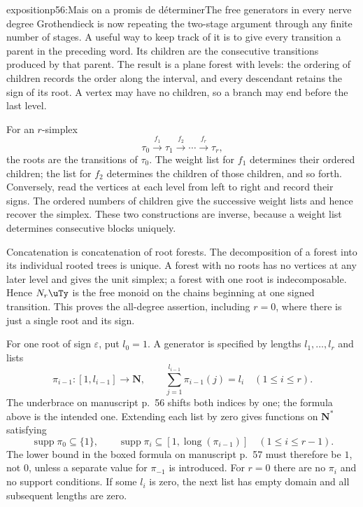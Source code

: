 \begin{dcomment}{exposition}{p56:Mais on a promis de déterminer}{The free generators in every nerve degree}
Grothendieck is now repeating the two-stage argument through any finite number of stages. A useful way to keep track of it is to give every transition a parent in the preceding word. Its children are the consecutive transitions produced by that parent. The result is a plane forest with levels: the ordering of children records the order along the interval, and every descendant retains the sign of its root. A vertex may have no children, so a branch may end before the last level.

For an $r$-simplex
\[
 \tau_0\xrightarrow{f_1}\tau_1\xrightarrow{f_2}\cdots
 \xrightarrow{f_r}\tau_r,
\]
the roots are the transitions of $\tau_0$. The weight list for $f_1$ determines their ordered children; the list for $f_2$ determines the children of those children, and so forth. Conversely, read the vertices at each level from left to right and record their signs. The ordered numbers of children give the successive weight lists and hence recover the simplex. These two constructions are inverse, because a weight list determines consecutive blocks uniquely.

Concatenation is concatenation of root forests. The decomposition of a forest into its individual rooted trees is unique. A forest with no roots has no vertices at any later level and gives the unit simplex; a forest with one root is indecomposable. Hence $N_r\uTy$ is the free monoid on the chains beginning at one signed transition. This proves the all-degree assertion, including $r=0$, where there is just a single root and its sign.

For one root of sign $\varepsilon$, put $l_0=1$. A generator is specified by lengths $l_1,\ldots,l_r$ and lists
\[
 \pi_{i-1}:[1,l_{i-1}]\longrightarrow\mathbf N,
 \qquad
 \sum_{j=1}^{l_{i-1}}\pi_{i-1}(j)=l_i
 \quad(1\leq i\leq r).
\]
The underbrace on manuscript p.~56 shifts both indices by one; the formula above is the intended one. Extending each list by zero gives functions on $\mathbf N^*$ satisfying
\[
 \operatorname{supp}\pi_0\subseteq\{1\},\qquad
 \operatorname{supp}\pi_i\subseteq
 [1,\operatorname{long}(\pi_{i-1})]
 \quad(1\leq i\leq r-1).
\]
The lower bound in the boxed formula on manuscript p.~57 must therefore be $1$, not $0$, unless a separate value for $\pi_{-1}$ is introduced. For $r=0$ there are no $\pi_i$ and no support conditions. If some $l_i$ is zero, the next list has empty domain and all subsequent lengths are zero.


\end{dcomment}
